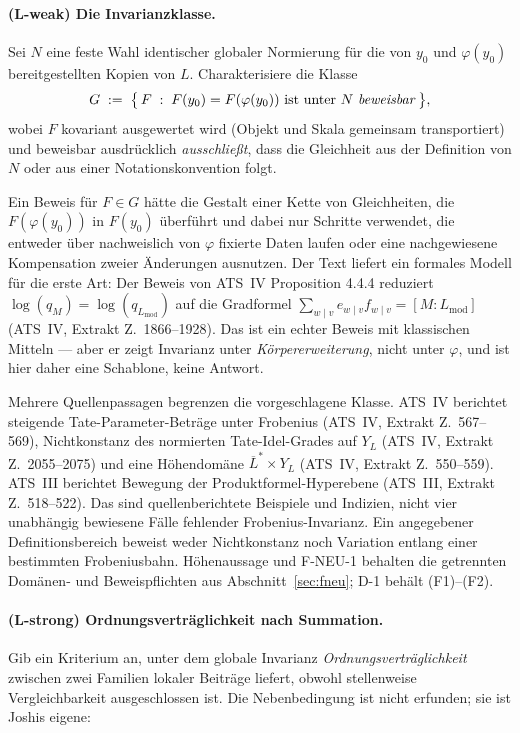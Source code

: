 \documentclass[11pt,a4paper]{article}
\theoremstyle{definition}
\theoremstyle{plain}
\theoremstyle{definition}
\newcommand{\Ynum}{Y_L}
\newcommand{\anchor}[2]{(#1, Extrakt Z.~#2)}
\begin{document}
\paragraph{(L-weak) Die Invarianzklasse.}
Sei $N$ eine feste Wahl identischer globaler Normierung für die von $y_0$ und
$\varphi(y_0)$ bereitgestellten Kopien von $L$. Charakterisiere die Klasse
\[
  G \;:=\; \bigl\{\, F \;:\; F(y_0) = F(\varphi(y_0)) \text{ ist unter } N
  \text{ \emph{beweisbar}} \,\bigr\},
\]
wobei $F$ kovariant ausgewertet wird (Objekt und Skala gemeinsam transportiert) und
\glqq beweisbar\grqq{} ausdrücklich \emph{ausschließt}, dass die Gleichheit aus der
Definition von $N$ oder aus einer Notationskonvention folgt.

Ein Beweis für $F \in G$ hätte die Gestalt einer Kette von Gleichheiten, die
$F(\varphi(y_0))$ in $F(y_0)$ überführt und dabei nur Schritte verwendet, die
entweder über nachweislich von $\varphi$ fixierte Daten laufen oder eine
nachgewiesene Kompensation zweier Änderungen ausnutzen. Der Text liefert ein
formales Modell für die erste Art: Der Beweis von ATS~IV Proposition 4.4.4
reduziert $\log(q_M) = \log(q_{L_{\mathrm{mod}}})$ auf die Gradformel
$\sum_{w\mid v} e_{w\mid v} f_{w\mid v} = [M : L_{\mathrm{mod}}]$
\anchor{ATS~IV}{1866--1928}. Das ist ein echter Beweis mit klassischen Mitteln ---
aber er zeigt Invarianz unter \emph{Körpererweiterung}, nicht unter $\varphi$, und
ist hier daher eine Schablone, keine Antwort.

Mehrere Quellenpassagen begrenzen die vorgeschlagene Klasse. ATS~IV
berichtet steigende Tate-Parameter-Beträge unter Frobenius
\anchor{ATS~IV}{567--569}, Nichtkonstanz des normierten Tate-Idel-Grades
auf $\Ynum$ \anchor{ATS~IV}{2055--2075} und eine Höhendomäne
$\overline L^*\times\Ynum$ \anchor{ATS~IV}{550--559}.
ATS~III berichtet Bewegung der Produktformel-Hyperebene
\anchor{ATS~III}{518--522}.
Das sind quellenberichtete Beispiele und Indizien, nicht vier unabhängig
bewiesene Fälle fehlender Frobenius-Invarianz. Ein angegebener
Definitionsbereich beweist weder Nichtkonstanz noch Variation entlang
einer bestimmten Frobeniusbahn. Höhenaussage und F-NEU-1 behalten die
getrennten Domänen- und Beweispflichten aus Abschnitt~\ref{sec:fneu};
D-1 behält (F1)--(F2).

\paragraph{(L-strong) Ordnungsverträglichkeit nach Summation.}
Gib ein Kriterium an, unter dem globale Invarianz \emph{Ordnungsverträglichkeit}
zwischen zwei Familien lokaler Beiträge liefert, obwohl stellenweise
Vergleichbarkeit ausgeschlossen ist. Die Nebenbedingung ist nicht erfunden; sie ist
Joshis eigene:
\end{document}
